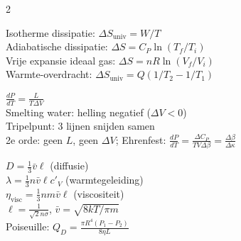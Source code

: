\documentclass[10pt,a4paper]{article}
\begin{document}
\begin{multicols}{2}
\begin{formulabox}[title=Entropie Irreversibele Processen]
Isotherme dissipatie: $\Delta S_\text{univ} = W/T$\\
Adiabatische dissipatie: $\Delta S = C_P\ln(T_f/T_i)$\\
Vrije expansie ideaal gas: $\Delta S = nR\ln(V_f/V_i)$\\
Warmte-overdracht: $\Delta S_\text{univ} = Q(1/T_2 - 1/T_1)$
\end{formulabox}

\begin{formulabox}[title=Clapeyron \& Faseover-gangen]
$\frac{dP}{dT} = \frac{L}{T\Delta V}$\\
Smelting water: helling negatief ($\Delta V < 0$)\\
Tripelpunt: 3 lijnen snijden samen\\
2e orde: geen $L$, geen $\Delta V$; Ehrenfest: $\frac{dP}{dT} = \frac{\Delta C_P}{TV\Delta\beta} = \frac{\Delta\beta}{\Delta\kappa}$
\end{formulabox}

\begin{formulabox}[title=Transport -- Snelle Formules]
$D = \frac{1}{3}\bar{v}\ell$ (diffusie)\\
$\lambda = \frac{1}{3}n\bar{v}\ell c'_V$ (warmtegeleiding)\\
$\eta_\text{visc} = \frac{1}{3}nm\bar{v}\ell$ (viscositeit)\\
$\ell = \frac{1}{\sqrt{2}n\sigma}$, $\bar{v} = \sqrt{8kT/\pi m}$\\
Poiseuille: $Q_D = \frac{\pi R^4 (P_1-P_2)}{8\eta L}$
\end{formulabox}

\end{multicols}

\end{document}
